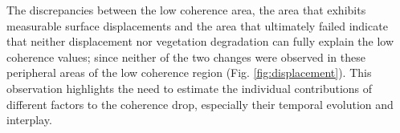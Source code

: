 \documentclass[journal abbreviation, manuscript]{copernicus}
\begin{document}
The discrepancies between the low coherence area, the area that exhibits measurable surface displacements and the area that ultimately failed indicate that neither displacement nor vegetation degradation can fully explain the low coherence values; since neither of the two changes were observed in these peripheral areas of the low coherence region (Fig. \ref{fig:displacement}). This observation highlights the need to estimate the individual contributions of different factors to the coherence drop, especially their temporal evolution and interplay. 
\par
\end{document}
